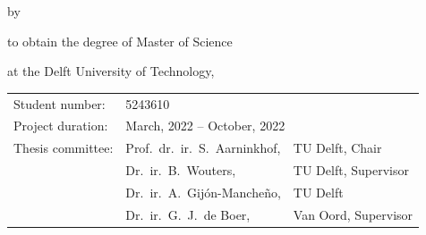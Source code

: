\begin{titlepage}


    \begin{center}


        {\makeatletter
            \largetitlestyle\fontsize{48}{94}\selectfont\@title
            \makeatother}

        {\makeatletter
            \ifx\@subtitle\undefined\else
                \bigskip
                {\tudsffamily\fontsize{22}{32}\selectfont\@subtitle}
            \fi
            \makeatother}

        \bigskip
        \bigskip

        by

        \bigskip
        \bigskip

        {\makeatletter
            \largetitlestyle\fontsize{26}{26}\selectfont\@author
            \makeatother}

        \bigskip
        \bigskip

        to obtain the degree of Master of Science

        at the Delft University of Technology,


        \vfill
        \begin{tabular}{lll}
            Student number:   & 5243610                                                       \\
            Project duration: & \multicolumn{2}{l}{March, 2022 -- October, 2022}                        \\
            Thesis committee: & Prof.\ dr.\ ir.\ S.\ Aarninkhof,       & TU Delft, Chair      \\
                              & Dr.\ ir.\ B.\ Wouters,                 & TU Delft, Supervisor \\
                              & Dr.\ ir.\ A.\ Gijón-Mancheño,          & TU Delft             \\
                              & Dr.\ ir.\ G.\ J.\    de Boer,                 & Van Oord, Supervisor
        \end{tabular}


\end{center}
\end{titlepage}
